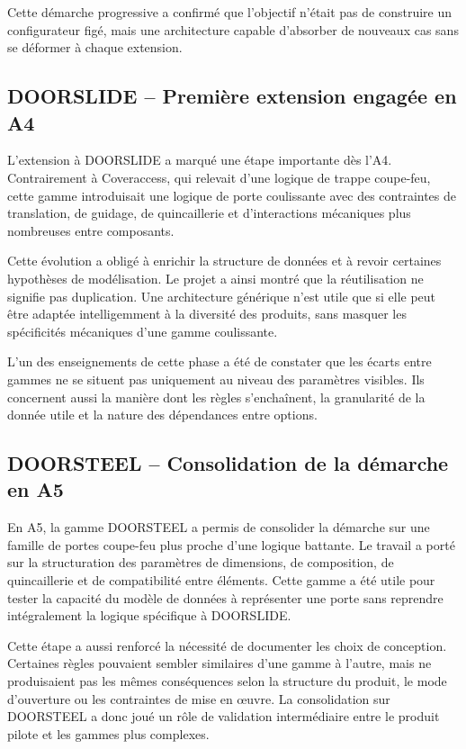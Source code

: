Cette démarche progressive a confirmé que l'objectif n'était pas de construire un configurateur figé, mais une architecture capable d'absorber de nouveaux cas sans se déformer à chaque extension.

\subsection{DOORSLIDE -- Première extension engagée en A4}

L'extension à DOORSLIDE a marqué une étape importante dès l'A4. Contrairement à Coveraccess, qui relevait d'une logique de trappe coupe-feu, cette gamme introduisait une logique de porte coulissante avec des contraintes de translation, de guidage, de quincaillerie et d'interactions mécaniques plus nombreuses entre composants.

Cette évolution a obligé à enrichir la structure de données et à revoir certaines hypothèses de modélisation. Le projet a ainsi montré que la réutilisation ne signifie pas duplication. Une architecture générique n'est utile que si elle peut être adaptée intelligemment à la diversité des produits, sans masquer les spécificités mécaniques d'une gamme coulissante.

L'un des enseignements de cette phase a été de constater que les écarts entre gammes ne se situent pas uniquement au niveau des paramètres visibles. Ils concernent aussi la manière dont les règles s'enchaînent, la granularité de la donnée utile et la nature des dépendances entre options.

\subsection{DOORSTEEL -- Consolidation de la démarche en A5}

En A5, la gamme DOORSTEEL a permis de consolider la démarche sur une famille de portes coupe-feu plus proche d'une logique battante. Le travail a porté sur la structuration des paramètres de dimensions, de composition, de quincaillerie et de compatibilité entre éléments. Cette gamme a été utile pour tester la capacité du modèle de données à représenter une porte sans reprendre intégralement la logique spécifique à DOORSLIDE.

Cette étape a aussi renforcé la nécessité de documenter les choix de conception. Certaines règles pouvaient sembler similaires d'une gamme à l'autre, mais ne produisaient pas les mêmes conséquences selon la structure du produit, le mode d'ouverture ou les contraintes de mise en \oe uvre. La consolidation sur DOORSTEEL a donc joué un rôle de validation intermédiaire entre le produit pilote et les gammes plus complexes.

